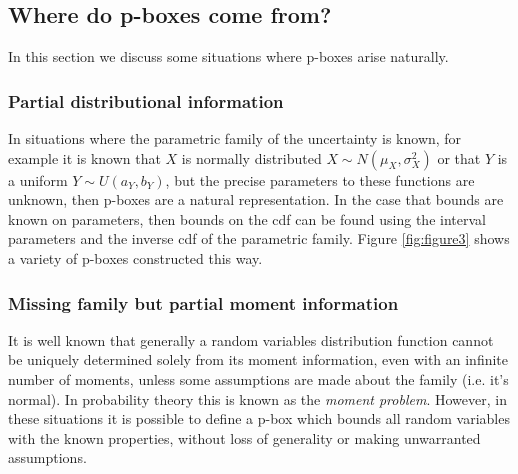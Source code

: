 \documentclass{juliacon}
\begin{document}
\subsection{Where do p-boxes come from?}
\noindent In this section we discuss some situations where p-boxes arise naturally.
\subsubsection{Partial distributional information}
In situations where the parametric family of the uncertainty is known, for example it is known that $X$ is normally distributed $X \sim N(\mu_{X}, \sigma_{X}^{2})$ or that $Y$ is a uniform $Y \sim U(a_{Y},b_{Y})$, but the precise parameters to these functions are unknown, then p-boxes are a natural representation. In the case that bounds are known on parameters, then bounds on the cdf can be found using the interval parameters and the inverse cdf of the parametric family. Figure \ref{fig:figure3} shows a variety of p-boxes constructed this way.
\subsubsection{Missing family but partial moment information}
\label{section:Moments}
It is well known that generally a random variables distribution function cannot be uniquely determined solely from its moment information, even with an infinite number of moments, unless some assumptions are made about the family (i.e. it's normal). In probability theory this is known as the \textit{moment problem}. However, in these situations it is possible to define a p-box which bounds all random variables with the known properties, without loss of generality or making unwarranted assumptions.
\end{document}
